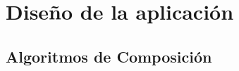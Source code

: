 \chapter{Diseño de la aplicación}





\section{Algoritmos de Composición}
\label{sec:algcomp}
























